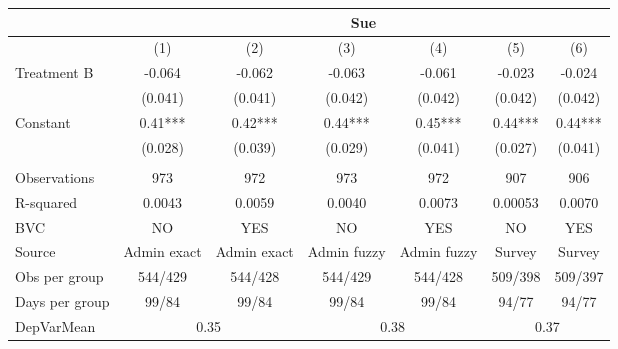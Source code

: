\begin{tabular}{lcccccc}
\toprule
      & \multicolumn{6}{c}{Sue} \\
\midrule
\midrule
      & (1)   & (2)   & (3)   & (4)   & (5)   & (6) \\
\midrule
\midrule
Treatment B & -0.064 & -0.062 & -0.063 & -0.061 & -0.023 & -0.024 \\
      & (0.041) & (0.041) & (0.042) & (0.042) & (0.042) & (0.042) \\
Constant  & 0.41*** & 0.42*** & 0.44*** & 0.45*** & 0.44*** & 0.44*** \\
      & (0.028) & (0.039) & (0.029) & (0.041) & (0.027) & (0.041) \\
      &       &       &       &       &       &  \\
\midrule
Observations & 973   & 972   & 973   & 972   & 907   & 906 \\
R-squared & 0.0043 & 0.0059 & 0.0040 & 0.0073 & 0.00053 & 0.0070 \\
BVC   & NO    & YES   & NO    & YES   & NO    & YES \\
Source & Admin exact & Admin exact & Admin fuzzy & Admin fuzzy & Survey & Survey \\
Obs per group & 544/429 & 544/428 & 544/429 & 544/428 & 509/398 & 509/397 \\
Days per group & 99/84 & 99/84 & 99/84 & 99/84 & 94/77 & 94/77 \\
DepVarMean & \multicolumn{2}{c}{0.35} & \multicolumn{2}{c}{0.38} & \multicolumn{2}{c}{0.37} \\
\bottomrule
\bottomrule
\end{tabular}%
